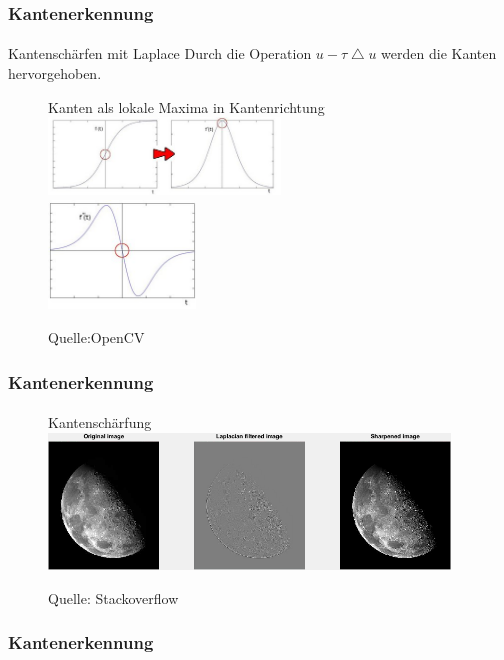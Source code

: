 \documentclass{beamer}
\begin{document}
\begin{frame}
    \frametitle{Kantenerkennung}
\framesubtitle{}
\begin{block}{Kantenschärfen mit Laplace}
Durch die Operation $u - \tau \bigtriangleup u$ werden die Kanten hervorgehoben.
\end{block}
\begin{figure}[htp]
      \centering
Kanten als lokale Maxima in Kantenrichtung \\
    \includegraphics[width=0.55\textwidth]{images/laplace1} \\
    \includegraphics[width=0.35\textwidth]{images/laplace2} 
      \caption{Quelle:OpenCV}
\end{figure}
 \end{frame}

\begin{frame}
    \frametitle{Kantenerkennung}
\framesubtitle{}
\begin{figure}[htp]
      \centering
Kantenschärfung \\
    \includegraphics[width=0.95\textwidth]{images/sharpening} 
      \caption{Quelle: Stackoverflow}
\end{figure}
 \end{frame}





\begin{frame}
    \frametitle{Kantenerkennung}
\framesubtitle{}
\begin{block}{}
\end{block}
 \end{frame}
\end{document}
